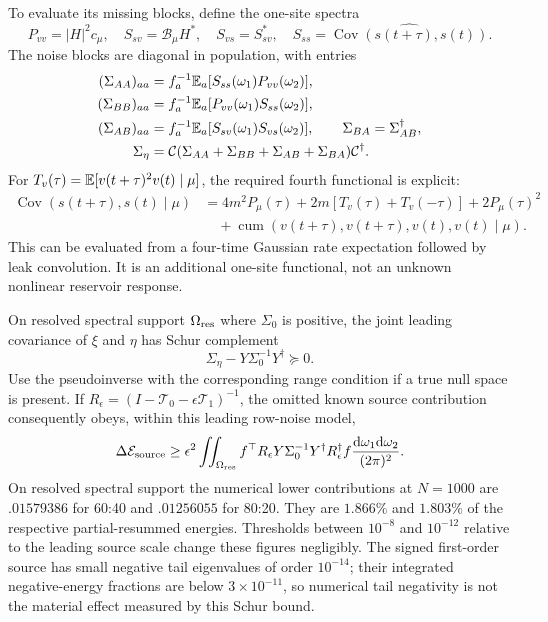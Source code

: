 To evaluate its missing blocks, define the one-site spectra
\[
 P_{vv}=|H|^2c_\mu,\quad S_{sv}=\mathcal B_\mu H^*,\quad
 S_{vs}=S_{sv}^*,\quad S_{ss}=\widehat{\operatorname{Cov}(s(t+\tau),s(t))}.
\]
The noise blocks are diagonal in population, with entries
\begin{align*}
 (\Sigma_{AA})_{aa}&=f_a^{-1}\mathbb E_a[S_{ss}(\omega_1)P_{vv}(\omega_2)],\\
 (\Sigma_{BB})_{aa}&=f_a^{-1}\mathbb E_a[P_{vv}(\omega_1)S_{ss}(\omega_2)],\\
 (\Sigma_{AB})_{aa}&=f_a^{-1}\mathbb E_a[S_{sv}(\omega_1)S_{vs}(\omega_2)],
 \qquad \Sigma_{BA}=\Sigma_{AB}^{\dagger},\\
 \Sigma_\eta&=\mathcal C
  (\Sigma_{AA}+\Sigma_{BB}+\Sigma_{AB}+\Sigma_{BA})\mathcal C^\dagger.
\end{align*}
For $T_v(\tau)=\mathbb E[v(t+\tau)^2v(t)\mid\mu]$, the required fourth functional
is explicit:
\begin{align*}
 \operatorname{Cov}(s(t+\tau),s(t)\mid\mu)
 &=4m^2P_\mu(\tau)+2m[T_v(\tau)+T_v(-\tau)]
       +2P_\mu(\tau)^2\\
 &\quad+\operatorname{cum}(v(t+\tau),v(t+\tau),v(t),v(t)\mid\mu).
\end{align*}
This can be evaluated from a four-time Gaussian rate expectation followed
by leak convolution. It is an additional one-site functional, not an unknown
nonlinear reservoir response.

On resolved spectral support $\Omega_{\rm res}$ where $\Sigma_0$ is positive,
the joint leading
covariance of $\xi$ and $\eta$ has Schur complement
\[
 \Sigma_\eta-Y\Sigma_0^{-1}Y^\dagger\succeq0.
\]
Use the pseudoinverse with the corresponding range condition if a true null
space is present. If $R_\epsilon=(I-\mathcal T_0-\epsilon\mathcal T_1)^{-1}$,
the omitted known source contribution consequently obeys, within this
leading row-noise model,
\[
 \Delta\mathcal E_{\rm source}
 \ge\epsilon^2\iint_{\Omega_{\rm res}} f^\top R_\epsilon
       Y\Sigma_0^{-1}Y^\dagger R_\epsilon^\dagger f
       \frac{\mathrm d\omega_1\mathrm d\omega_2}{(2\pi)^2}.
\]
On resolved spectral support the numerical lower contributions at $N=1000$
are $.01579386$ for 60:40 and $.01256055$ for 80:20. They are $1.866\%$ and
$1.803\%$ of the respective partial-resummed energies. Thresholds between
$10^{-8}$ and $10^{-12}$ relative to the leading source scale change these
figures negligibly. The signed first-order source has small negative tail
eigenvalues of order $10^{-14}$; their integrated negative-energy fractions
are below $3\times10^{-11}$, so numerical tail negativity is not the
material effect measured by this Schur bound.

